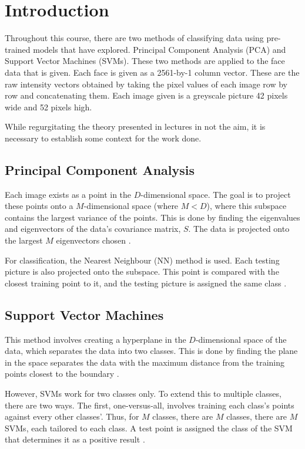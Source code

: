 \documentclass[a4paper, 10pt, conference]{ieeeconf}
\begin{document}
\section{Introduction}
Throughout this course, there are two methods of classifying data using pre-trained models that have explored. Principal Component Analysis (PCA) and Support Vector Machines (SVMs). These two methods are applied to the face data that is given. Each face is given as a 2561-by-1 column vector. These are the raw intensity vectors obtained by taking the pixel values of each image row by row and concatenating them. Each image given is a greyscale picture 42 pixels wide and 52 pixels high.

While regurgitating the theory presented in lectures in not the aim, it is necessary to establish some context for the work done.

\subsection{Principal Component Analysis}\label{sec:pcatheory}
Each image exists as a point in the $D$-dimensional space. The goal is to project these points onto a $M$-dimensional space (where $ M < D$), where this subspace contains the largest variance of the points. This is done by finding the eigenvalues and eigenvectors of the data's covariance matrix, $S$. The data is projected onto the largest $M$ eigenvectors chosen \cite{pca}.

For classification, the Nearest Neighbour (NN) method is used. Each testing picture is also projected onto the subspace. This point is compared with the closest training point to it, and the testing picture is assigned the same class \cite{pca}.

\subsection{Support Vector Machines}\label{sec:svmtheory}
This method involves creating a hyperplane in the $D$-dimensional space of the data, which separates the data into two classes. This is done by finding the plane in the space separates the data with the maximum distance from the training points closest to the boundary \cite{svm}.

However, SVMs work for two classes only. To extend this to multiple classes, there are two ways. The first, one-versus-all, involves training each class's points against every other classes'. Thus, for $M$ classes, there are $M$ classes, there are $M$ SVMs, each tailored to each class. A test point is assigned the class of the SVM that determines it as a positive result \cite{svm}.
\end{document}
